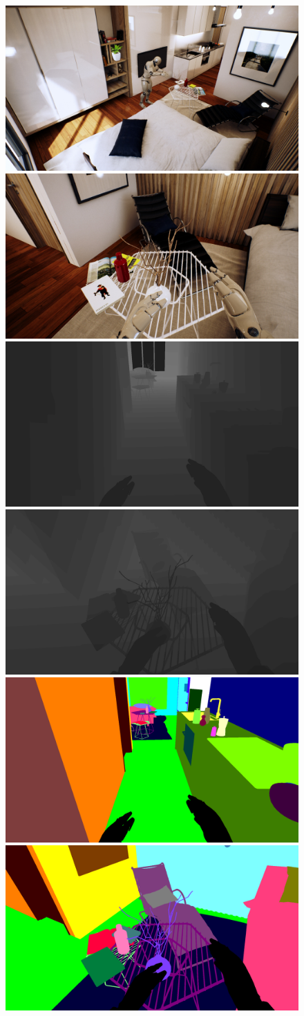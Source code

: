 \begin{figure}[!htb]
    \centering
    \includegraphics[width=0.45\linewidth]{Figures/Sim2Real/rgb0.jpg}
    \includegraphics[width=0.45\linewidth]{Figures/Sim2Real/rgb1.jpg}\\
    \includegraphics[width=0.45\linewidth]{Figures/Sim2Real/depth0}
    \includegraphics[width=0.45\linewidth]{Figures/Sim2Real/depth1}\\
    \includegraphics[width=0.45\linewidth]{Figures/Sim2Real/mask0}
    \includegraphics[width=0.45\linewidth]{Figures/Sim2Real/mask1}\\

\end{figure}
